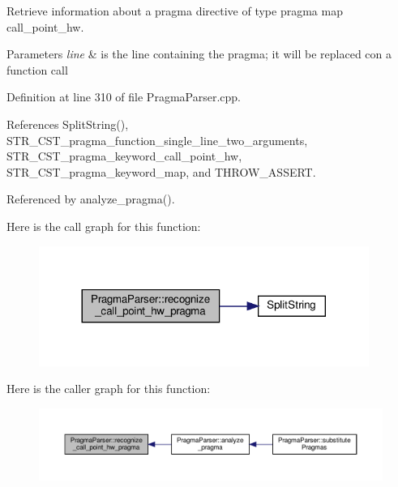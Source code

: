 Retrieve information about a pragma directive of type pragma map call\+\_\+point\+\_\+hw. 


\begin{DoxyParams}{Parameters}
{\em line} & is the line containing the pragma; it will be replaced con a function call \\
\hline
\end{DoxyParams}


Definition at line 310 of file Pragma\+Parser.\+cpp.



References Split\+String(), S\+T\+R\+\_\+\+C\+S\+T\+\_\+pragma\+\_\+function\+\_\+single\+\_\+line\+\_\+two\+\_\+arguments, S\+T\+R\+\_\+\+C\+S\+T\+\_\+pragma\+\_\+keyword\+\_\+call\+\_\+point\+\_\+hw, S\+T\+R\+\_\+\+C\+S\+T\+\_\+pragma\+\_\+keyword\+\_\+map, and T\+H\+R\+O\+W\+\_\+\+A\+S\+S\+E\+RT.



Referenced by analyze\+\_\+pragma().

Here is the call graph for this function\+:
\nopagebreak
\begin{figure}[H]
\begin{center}
\leavevmode
\includegraphics[width=305pt]{d6/d6c/classPragmaParser_a74e5f7f8d176b4b1b1d86a06a629d360_cgraph}
\end{center}
\end{figure}
Here is the caller graph for this function\+:
\nopagebreak
\begin{figure}[H]
\begin{center}
\leavevmode
\includegraphics[width=350pt]{d6/d6c/classPragmaParser_a74e5f7f8d176b4b1b1d86a06a629d360_icgraph}
\end{center}
\end{figure}
\mbox{\label{classPragmaParser_ac119f35e2a4b60c2f332305025b64ad5}} 
